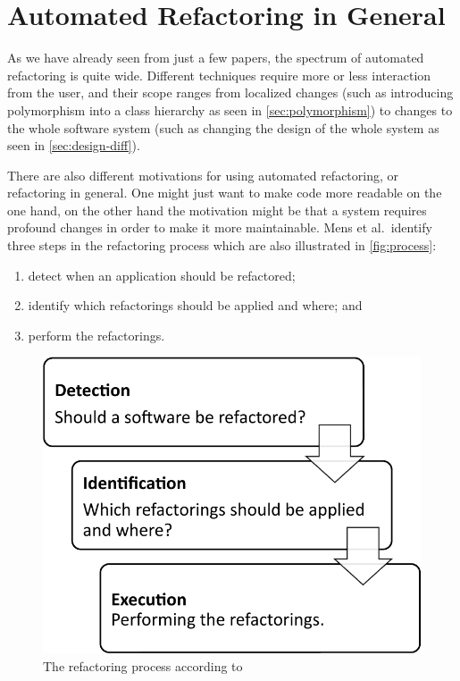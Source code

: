 \documentclass[conference,compsoc,a4paper]{IEEEtran}
\begin{document}
\section{Automated Refactoring in General}

As we have already seen from just a few papers, the spectrum of automated refactoring is quite wide. Different 
techniques require more or less interaction from the user, and their scope ranges from localized changes (such as 
introducing polymorphism into a class hierarchy as seen in \autoref{sec:polymorphism}) to changes to the whole software 
system (such as changing the design of the whole system as seen in \autoref{sec:design-diff}).

There are also different motivations for using automated refactoring, or refactoring in general. One might just want to 
make code more readable on the one hand, on the other hand the motivation might be that a system requires profound 
changes in order to make it more maintainable.
Mens et al.\ identify three steps in the refactoring process \cite{DBLP:conf/iwpse/MensTM03} which are also illustrated 
in \autoref{fig:process}:
\begin{enumerate}
  \item detect when an application should be refactored;
  \item identify which refactorings should be applied and where; and
  \item perform the refactorings.
\end{enumerate}

\begin{figure}[htb]
  \centering
    \includegraphics[width=0.8\linewidth]{figures/process}
  \caption{The refactoring process according to \cite{DBLP:conf/iwpse/MensTM03}}
  \label{fig:process}
\end{figure}
\end{document}

